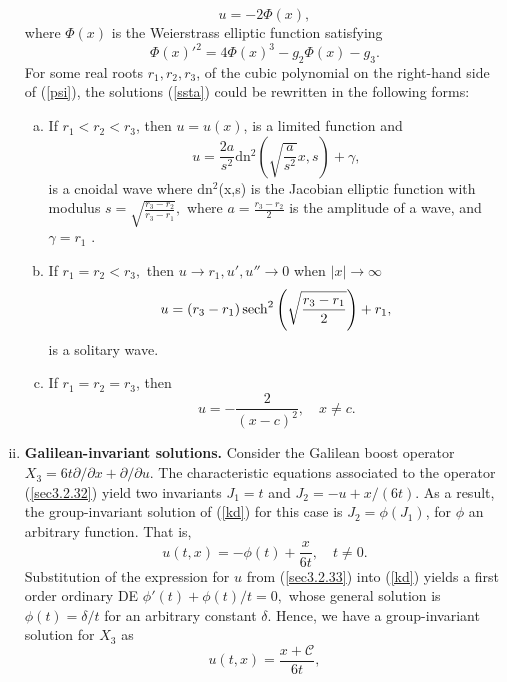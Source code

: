 \begin{enumerate}[(i)]
\begin{equation}
u = -2 \Phi(x),  \label{ssta}
\end{equation} where $\Phi(x)$ is the Weierstrass elliptic function satisfying \begin{equation}  \Phi(x)'^2 = 4  \Phi(x)^3 -g_2 \Phi(x)-g_3. \label{secwes}
\end{equation} For some real roots $r_1, r_2 ,r_3$, of the cubic polynomial on the right-hand side of (\ref{psi}), the solutions (\ref{ssta}) could be rewritten in the following forms: \citep{ibragimov1995crc}
\begin{enumerate}[(a)]
	\item If $r_1 <r_2 <r_3$, then $ u = u(x)$, is a limited function and \begin{equation}\label{sba} u = \frac{2a}{s^2} \mathrm{dn^2} \left( \sqrt{ \frac{a}{s^2}}x,s\right)+ \gamma,
	\end{equation} is a cnoidal wave where $\mathrm{dn^2}$(x,s) is the Jacobian elliptic function with modulus \newline$ s = \sqrt{ \frac{r_3-r_2}{  r_3-r_1} },$ where $
	 a=\frac{r_3-r_2}{2}$ is the amplitude of a wave, and $ \gamma=r_1$ .
	\item If $ r_1 = r_2 < r_3, $ then $ u \to r_1, u', u'' \to 0$ when $ |x| \to \infty$   \begin{equation} u = (r_3-r_1) \operatorname{sech}^2 \left( \sqrt{ \frac{r_3-r_1}{2}}\right)+ r_1,
	\end{equation} is a  solitary wave.
	\item If $ r_1 = r_2 =r_3$, then 
	\begin{equation} u = -\frac{2}{ (x-c)^2},\quad  x\neq c.
	\end{equation}
\end{enumerate}
\item \textbf{Galilean-invariant solutions.} \newline
 Consider the Galilean boost operator $ X_3 = 6t  \partial / \partial x + \partial / \partial u. $
  The characteristic equations associated to the operator (\ref{sec3.2.32}) yield two invariants $ J_1 = t$ and  $J_2 = -u+x/(6t)$. As a result, the group-invariant solution of (\ref{kd}) for this case is $ J_2 = \phi(J_1)$, for $\phi$ an arbitrary function. That is, \begin{equation} u(t,x) =-\phi(t)+ \frac{x}{6t}, \quad t\neq 0. \label{sec3.2.33}
\end{equation}
Substitution of the expression for $u$ from  (\ref{sec3.2.33}) into  (\ref{kd}) yields a first order ordinary DE $ \phi'(t) +  \phi(t)/t=0,$ whose general solution is  $\phi(t) =  \delta/ t $ for  an arbitrary constant $\delta$. Hence, we have a group-invariant solution for $X_3$ as  \begin{equation} u(t,x) =   \frac{ x+ \mathcal{C}}{6t} , \label{sec3.2.34}

\end{equation}
\end{enumerate}
